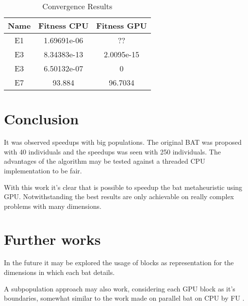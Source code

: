 \documentclass[conference]{IEEEtran}
\begin{document}
\begin{table}[!t]
    \renewcommand{\arraystretch}{1.3}
    \caption{Convergence Results}
    \label{results}
    \centering
    \begin{tabular}{c|c|c}
    \hline
        \bf Name & Fitness CPU & Fitness GPU \\
    \hline
        E1 & 1.69691e-06 & ?? \\
        E3 & 8.34383e-13 &  2.0095e-15  \\
        E3 & 6.50132e-07 & 0 \\
        E7 & 93.884 & 96.7034 & \\
    \end{tabular}
\end{table}

\section{Conclusion}

It was observed speedups with big populations. The original BAT was
proposed with 40 individuals and the speedups was seen with 250
individuals.
The advantages of the algorithm may be tested against a threaded CPU implementation to be fair.

With this work it's clear that is possible to speedup the bat metaheuristic using GPU. Notwithstanding the best results are only achievable on really complex problems with many dimensions.

\section{Further works}

In the future it may be explored the usage of blocks as representation for the
dimensions in which each bat details.

A subpopulation approach may also work, considering each GPU block as it's boundaries, somewhat similar to the work made on parallel bat on CPU by FU \cite{paralellCPU}.
\end{document}
